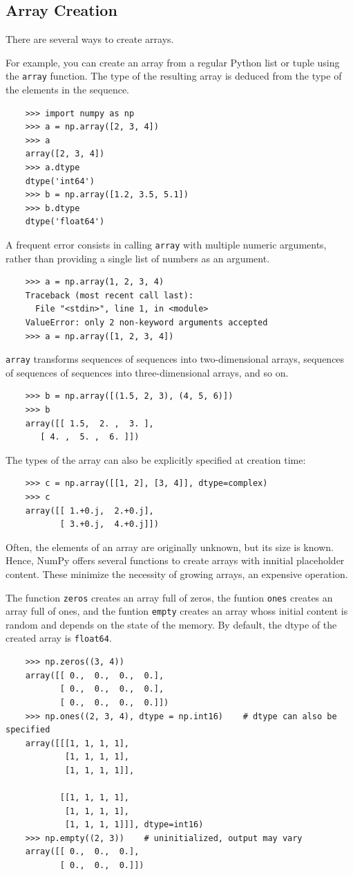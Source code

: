 \documentclass[UTF8]{article}
\begin{document}
\subsection{Array Creation}
There are several ways to create arrays.

For example, you can create an array from a regular Python list or tuple using the \texttt{array}
function. The type of the resulting array is deduced from the type of the elements in the sequence.
\begin{verbatim}
    >>> import numpy as np
    >>> a = np.array([2, 3, 4])
    >>> a
    array([2, 3, 4])
    >>> a.dtype
    dtype('int64')
    >>> b = np.array([1.2, 3.5, 5.1])
    >>> b.dtype
    dtype('float64')
\end{verbatim}

A frequent error consists in calling \texttt{array} with multiple numeric arguments, rather than
providing a single list of numbers as an argument.
\begin{verbatim}
    >>> a = np.array(1, 2, 3, 4)
    Traceback (most recent call last):
      File "<stdin>", line 1, in <module>
    ValueError: only 2 non-keyword arguments accepted
    >>> a = np.array([1, 2, 3, 4])
\end{verbatim}

\texttt{array} transforms sequences of sequences into two-dimensional arrays, sequences of
sequences of sequences into three-dimensional arrays, and so on.
\begin{verbatim}
    >>> b = np.array([(1.5, 2, 3), (4, 5, 6)])
    >>> b
    array([[ 1.5,  2. ,  3. ],
       [ 4. ,  5. ,  6. ]])
\end{verbatim}

The types of the array can also be explicitly specified at creation time:
\begin{verbatim}
    >>> c = np.array([[1, 2], [3, 4]], dtype=complex)
    >>> c
    array([[ 1.+0.j,  2.+0.j],
           [ 3.+0.j,  4.+0.j]])
\end{verbatim}

Often, the elements of an array are originally unknown, but its size is known. Hence, NumPy offers
several functions to create arrays with innitial placeholder content. These minimize the necessity
of growing arrays, an expensive operation.

The function \texttt{zeros} creates an array full of zeros, the funtion \texttt{ones} creates an
array full of ones, and the funtion \texttt{empty} creates an array whoss initial content is random
and depends on the state of the memory. By default, the dtype of the created array is
\texttt{float64}.
\begin{verbatim}
    >>> np.zeros((3, 4))
    array([[ 0.,  0.,  0.,  0.],
           [ 0.,  0.,  0.,  0.],
           [ 0.,  0.,  0.,  0.]])
    >>> np.ones((2, 3, 4), dtype = np.int16)    # dtype can also be specified
    array([[[1, 1, 1, 1],
            [1, 1, 1, 1],
            [1, 1, 1, 1]],

           [[1, 1, 1, 1],
            [1, 1, 1, 1],
            [1, 1, 1, 1]]], dtype=int16)
    >>> np.empty((2, 3))    # uninitialized, output may vary
    array([[ 0.,  0.,  0.],
           [ 0.,  0.,  0.]])
\end{verbatim}
\end{document}
